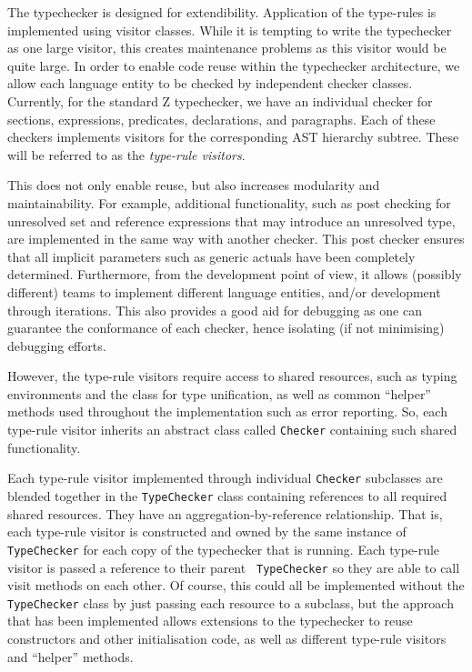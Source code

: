 \documentclass{llncs}
\begin{document}
The typechecker is designed for extendibility. Application of the type-rules
is implemented using visitor classes. While it is tempting to
write the typechecker as one large visitor, this creates maintenance
problems as this visitor would be quite large.  In order to enable
code reuse within the typechecker architecture, we allow each language
entity to be checked by independent checker classes.  Currently, for
the standard Z typechecker, we have an individual checker for
sections, expressions, predicates, declarations, and paragraphs. Each
of these checkers implements visitors for the corresponding AST hierarchy
subtree.  These will be referred to as the {\em type-rule visitors}.

This does not only enable reuse, but also increases modularity and
maintainability.  For example, additional functionality, such as post
checking for unresolved set and reference expressions that may
introduce an unresolved type, are implemented in the same way with
another checker. This post checker ensures that all implicit
parameters such as generic actuals have been completely determined.
Furthermore, from the development point of view, it allows (possibly
different) teams to implement different language entities, and/or
development through iterations.  This also provides a good aid for
debugging as one can guarantee the conformance of each checker, hence
isolating (if not minimising) debugging efforts.

However, the type-rule visitors require access to shared resources,
such as typing environments and the class for type unification, as
well as common ``helper'' methods used throughout the implementation
such as error reporting.  So, each type-rule visitor inherits an
abstract class called {\tt Checker} containing such shared
functionality.

Each type-rule visitor implemented through individual {\tt Checker}
subclasses are blended together in the {\tt TypeChecker} class
containing references to all required shared resources. They have an
aggregation-by-reference relationship.  That is, each type-rule
visitor is constructed and owned by the same instance of {\tt
TypeChecker} for each copy of the typechecker that is running.  Each
type-rule visitor is passed a reference to their parent {\tt
TypeChecker} so they are able to call visit methods on each other.  Of
course, this could all be implemented without the {\tt TypeChecker}
class by just passing each resource to a subclass, but the approach
that has been implemented allows extensions to the typechecker to
reuse constructors and other initialisation code, as well as different
type-rule visitors and ``helper'' methods.
\end{document}
